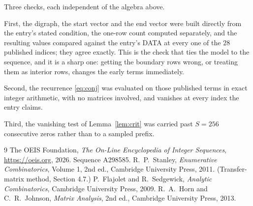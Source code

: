 \documentclass[11pt,a4paper]{article}
\theoremstyle{plain}
\theoremstyle{definition}
\begin{document}
Three checks, each independent of the algebra above.

First, the digraph, the start vector and the end vector were built directly from the
entry's stated condition, the one-row count computed separately, and the resulting values
compared against the entry's DATA at every one of the $28$ published indices; they
agree exactly. This is the check that ties the model to the sequence, and it is a sharp one:
getting the boundary rows wrong, or treating them as interior rows, changes the early terms
immediately.

Second, the recurrence \eqref{eq:conj} was evaluated on those published terms in exact
integer arithmetic, with no matrices involved, and vanishes at every index the entry claims.

Third, the vanishing test of Lemma~\ref{lem:crit} was carried past $S=256$ consecutive
zeros rather than to a sampled prefix.

\begin{thebibliography}{9}
 The OEIS Foundation, \emph{The On-Line Encyclopedia of Integer
Sequences}, \url{https://oeis.org}, 2026. Sequence A298585.
 R.~P.~Stanley, \emph{Enumerative Combinatorics}, Volume 1, 2nd ed.,
Cambridge University Press, 2011. (Transfer-matrix method, Section 4.7.)
 P.~Flajolet and R.~Sedgewick, \emph{Analytic Combinatorics}, Cambridge
University Press, 2009.
 R.~A.~Horn and C.~R.~Johnson, \emph{Matrix Analysis}, 2nd ed., Cambridge
University Press, 2013.
\end{thebibliography}
\end{document}
